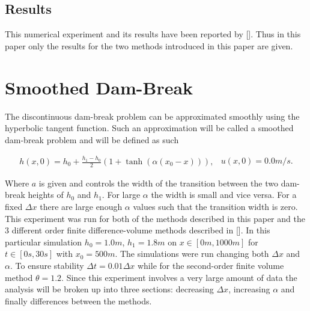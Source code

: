 \documentclass[SingleSpace,12pt,Proceedings]{Serre_ASCE}
\begin{document}
\subsection{Results}
This numerical experiment and its results have been reported by []. Thus in this paper only the results for the two methods introduced in this paper are given. 
  

\section{Smoothed Dam-Break}
\label{section:smootheddambreak}
The discontinuous dam-break problem can be approximated smoothly using the hyperbolic tangent function. Such an approximation will be called a smoothed dam-break problem and will be defined as such
\begin{linenomath*}
\begin{subequations}
\begin{gather}
h(x,0) = h_0 + \frac{h_1 - h_0}{2}\left(1 + \tanh\left(\alpha\left(x_0 - x\right)\right)\right),
\end{gather}
\begin{gather}
u(x,0) = 0.0m/s.
\end{gather}
\end{subequations}
\label{eq:sdbi}
\end{linenomath*}
Where $a$ is given and controls the width of the transition between the two dam-break heights of $h_0$ and $h_1$. For large $\alpha$ the width is small and vice versa. For a fixed $\Delta x$ there are large enough $\alpha$ values such that the transition width is zero. This experiment was run for both of the methods described in this paper and the 3 different order finite difference-volume methods described in []. In this particular simulation $h_0 = 1.0m$, $h_1 = 1.8m$ on $x \in [0m,1000m]$ for $t \in [0s,30s]$ with $x_0 = 500m$. The simulations were run changing both $\Delta x$ and $\alpha$. To ensure stability $\Delta t = 0.01 \Delta x$ while for the second-order finite volume method $\theta = 1.2$. Since this experiment involves a very large amount of data the analysis will be broken up into three sections: decreasing $\Delta x$, increasing $\alpha$ and finally differences between the methods. 
\end{document}

